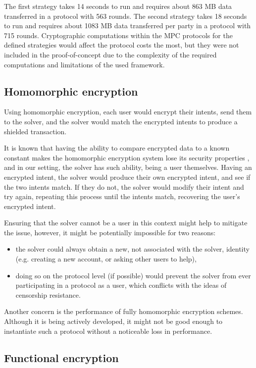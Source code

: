 \documentclass[
    9pt,            %
    report,        %
    affiltop,       %
]{art}
\begin{document}
The first strategy takes 14 seconds to run and requires about 863 MB data transferred in a protocol with 563 rounds. The second strategy takes 18 seconds to run and requires about 1083 MB data transferred per party in a protocol with 715 rounds. Cryptographic computations within the MPC protocols for the defined strategies would affect the protocol costs the most, but they were not included in the proof-of-concept due to the complexity of the required computations and limitations of the used framework.

\subsection{Homomorphic encryption}\label{HE-expanded}

Using homomorphic encryption, each user would encrypt their intents, send them to the solver, and the solver would match the encrypted intents to produce a shielded transaction.

It is known that having the ability to compare encrypted data to a known constant makes the homomorphic encryption system lose its security properties \citep{databanks}, and in our setting, the solver has such ability, being a user themselves. Having an encrypted intent, the solver would produce their own encrypted intent, and see if the two intents match. If they do not, the solver would modify their intent and try again, repeating this process until the intents match, recovering the user's encrypted intent. 

Ensuring that the solver cannot be a user in this context might help to mitigate the issue, however, it might be potentially impossible for two reasons:
\begin{itemize}
    \item the solver could always obtain a new, not associated with the solver, identity (e.g. creating a new account, or asking other users to help),
    \item doing so on the protocol level (if possible) would prevent the solver from ever participating in a protocol as a user, which conflicts with the ideas of censorship resistance.
\end{itemize}

Another concern is the performance of fully homomorphic encryption schemes. Although it is being actively developed, it might not be good enough to instantiate such a protocol without a noticeable loss in performance.

\subsection{Functional encryption}\label{FE-expanded}
\end{document}
